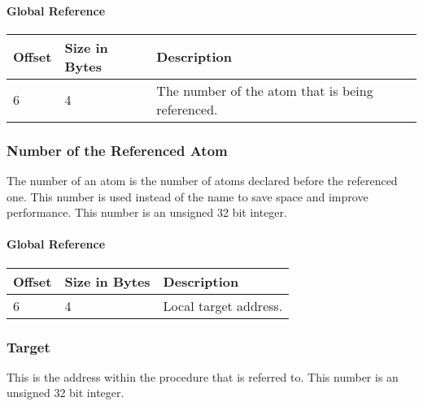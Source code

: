 \paragraph{Global Reference}
\begin{table}[h]
    \centering
    \label{tbl:global_reference}
    \begin{tabular}{|l|l|l|}
        \hline
        \textbf{Offset} & \textbf{Size in Bytes} & \textbf{Description}                             \\ \hline
        6               & 4                      & The number of the atom that is being referenced. \\ \hline
    \end{tabular}
\end{table}

\subsubsection{Number of the Referenced Atom}
The number of an atom is the number of atoms declared before the referenced one.
This number is used instead of the name to save space and improve performance. 
This number is an unsigned 32 bit integer.

\paragraph{Global Reference}
\begin{table}[h]
    \centering
    \label{tbl:local_reference}
    \begin{tabular}{|l|l|l|}
        \hline
        \textbf{Offset} & \textbf{Size in Bytes} & \textbf{Description}  \\ \hline
        6               & 4                      & Local target address. \\ \hline
    \end{tabular}
\end{table}

\subsubsection{Target}
This is the address within the procedure that is referred to.
This number is an unsigned 32 bit integer.